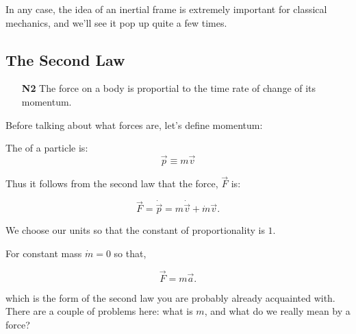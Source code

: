 In any case, the idea of an inertial frame is extremely important for classical mechanics, and we'll see 
it pop up quite a few times.

\subsection{The Second Law}

\begin{enumerate}
    \item[\textbf{N2}] The force on a body is proportial to the time rate of change of its momentum.
\end{enumerate}

Before talking about what forces are, let's define momentum:

\begin{definition}
    The  of a particle is:
    \begin{equation}
        \vec{p} \equiv m\vec{v}
    \end{equation}
\end{definition}

Thus it follows from the second law that the force, $\vec{F}$ is:

\begin{equation}
    \vec{F} = \dot{\vec{p}} = m\dot{\vec{v}} + \dot{m}\vec{v}.
\end{equation}

We choose our units so that the constant of proportionality is $1$.

For constant mass $\dot{m} = 0$ so that,

\begin{equation}
    \vec{F} = m\vec{a}.
\end{equation}

which is the form of the second law you are probably already acquainted with. There are a couple of problems 
here: what is $m$, and what do we really mean by a force?

